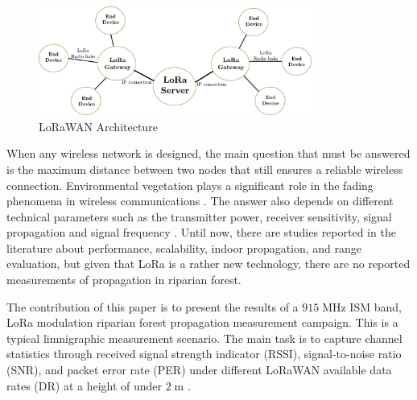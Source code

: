 \begin{figure}[!htb]
  \centering
  \includegraphics[width=0.8\textwidth]{Figure1}
  \caption{LoRaWAN Architecture \cite{Vangelista2015}}
  \label{fig:lorawanarchitecture}
\end{figure}


When any wireless network is designed, the main question that must be answered is the maximum distance between two nodes that still ensures a reliable wireless connection. Environmental vegetation plays a significant role in the fading phenomena in wireless communications \cite{Meng2008}. The answer also depends on different technical parameters such as the transmitter power, receiver sensitivity, signal propagation and signal frequency \cite{Harvanova2011}. Until now, there are studies reported in the literature about performance, scalability, indoor propagation, and range evaluation, but given that LoRa is a rather new technology, there are no reported measurements of propagation in riparian forest.


The contribution of this paper is to present the results of a $915\;$MHz ISM band, LoRa modulation riparian forest propagation measurement campaign. This is a typical limnigraphic measurement scenario. The main task is to capture channel statistics through received signal strength indicator (RSSI), signal-to-noise ratio (SNR), and packet error rate (PER) under different LoRaWAN available data rates (DR) at a height of under $2\;$m \cite{N.SorninSemtechM.LuisSemtechT.EirichIBMT.KrampIBM2015}.  

